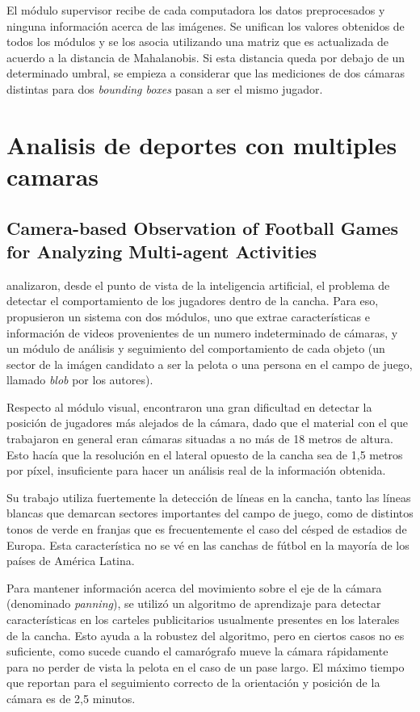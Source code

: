 \documentclass[a4paper,10pt]{article}
\begin{document}
El módulo supervisor recibe de cada computadora los datos preprocesados y ninguna información
acerca de las imágenes. Se unifican los valores obtenidos de todos los módulos y se los asocia
utilizando una matriz que es actualizada de acuerdo a la distancia de Mahalanobis. Si esta
distancia queda por debajo de un determinado umbral, se empieza a considerar que las mediciones
de dos cámaras distintas para dos \textit{bounding boxes} pasan a ser el mismo jugador.

\section{Analisis de deportes con multiples camaras}

\subsection{Camera-based Observation of Football Games for Analyzing Multi-agent Activities}

\citeauthor*{beetz-05, beetz-06} analizaron, desde el punto de vista de la inteligencia artificial,
el problema de detectar el comportamiento de los jugadores dentro de la cancha. Para eso, propusieron
un sistema con dos módulos, uno que extrae características e información de videos provenientes de
un numero indeterminado de cámaras, y un módulo de análisis y seguimiento del comportamiento de cada
objeto (un sector de la imágen candidato a ser la pelota o una persona en el campo de juego, 
llamado \textit{blob} por los autores).

Respecto al módulo visual, encontraron una gran dificultad en detectar la posición de jugadores más alejados
de la cámara, dado que el material con el que trabajaron en general eran cámaras situadas a no más de
18 metros de altura. Esto hacía que la resolución en el lateral opuesto de la cancha sea de 1,5 metros por píxel,
insuficiente para hacer un análisis real de la información obtenida.

Su trabajo utiliza fuertemente la detección de líneas en la cancha, tanto las líneas blancas que demarcan sectores
importantes del campo de juego, como de distintos tonos de verde en franjas que es frecuentemente el caso del césped de
estadios de Europa. Esta característica no se vé en las canchas de fútbol en la mayoría de los países de América Latina.

Para mantener información acerca del movimiento sobre el eje de la cámara (denominado \textit{panning}), se utilizó
un algoritmo de aprendizaje para detectar características en los carteles publicitarios usualmente presentes en los
laterales de la cancha. Esto ayuda a la robustez del algoritmo, pero en ciertos casos no es suficiente, como sucede
cuando el camarógrafo mueve la cámara rápidamente para no perder de vista la pelota en el caso de un pase largo.
El máximo tiempo que reportan para el seguimiento correcto de la orientación y posición de la cámara es de 2,5 minutos.
\end{document}
